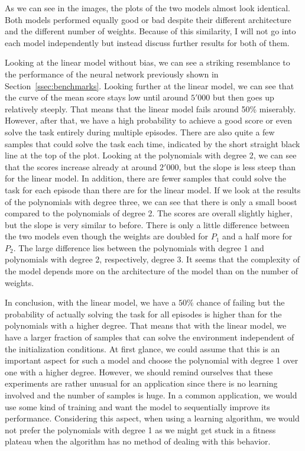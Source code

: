 As we can see in the images, the plots of the two models almost look identical. Both models performed equally good or bad despite their different architecture and the different number of weights. Because of this similarity, I will not go into each model independently but instead discuss further results for both of them.

Looking at the linear model without bias, we can see a striking resemblance to the performance of the neural network previously shown in Section~\ref{ssec:benchmarks}. Looking further at the linear model, we can see that the curve of the mean score stays low until around $5'000$ but then goes up relatively steeply. That means that the linear model fails around 50\% miserably. However, after that, we have a high probability to achieve a good score or even solve the task entirely during multiple episodes. There are also quite a few samples that could solve the task each time, indicated by the short straight black line at the top of the plot. Looking at the polynomials with degree 2, we can see that the scores increase already at around $2'000$, but the slope is less steep than for the linear model. In addition, there are fewer samples that could solve the task for each episode than there are for the linear model. If we look at the results of the polynomials with degree three, we can see that there is only a small boost compared to the polynomials of degree 2. The scores are overall slightly higher, but the slope is very similar to before. There is only a little difference between the two models even though the weights are doubled for $P_1$ and a half more for $P_2$. The large difference lies between the polynomials with degree 1 and polynomials with degree 2, respectively, degree 3. It seems that the complexity of the model depends more on the architecture of the model than on the number of weights.

In conclusion, with the linear model, we have a $50 \%$ chance of failing but the probability of actually solving the task for all episodes is higher than for the polynomials with a higher degree. That means that with the linear model, we have a larger fraction of samples that can solve the environment independent of the initialization conditions. At first glance, we could assume that this is an important aspect for such a model and choose the polynomial with degree 1 over one with a higher degree. However, we should remind ourselves that these experiments are rather unusual for an application since there is no learning involved and the number of samples is huge. In a common application, we would use some kind of training and want the model to sequentially improve its performance. Considering this aspect, when using a learning algorithm, we would not prefer the polynomials with degree 1 as we might get stuck in a fitness plateau when the algorithm has no method of dealing with this behavior.

